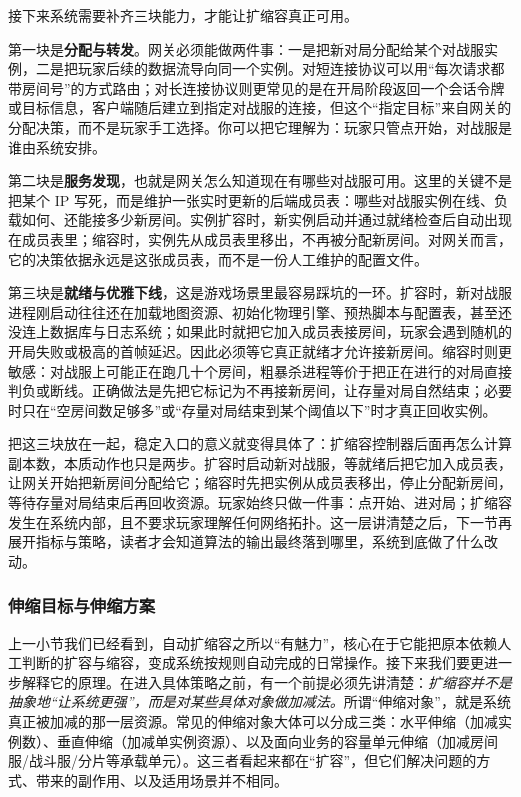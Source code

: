接下来系统需要补齐三块能力，才能让扩缩容真正可用。

第一块是\textbf{分配与转发}。网关必须能做两件事：一是把新对局分配给某个对战服实例，二是把玩家后续的数据流导向同一个实例。对短连接协议可以用“每次请求都带房间号”的方式路由；对长连接协议则更常见的是在开局阶段返回一个会话令牌或目标信息，客户端随后建立到指定对战服的连接，但这个“指定目标”来自网关的分配决策，而不是玩家手工选择。你可以把它理解为：玩家只管点开始，对战服是谁由系统安排。

第二块是\textbf{服务发现}，也就是网关怎么知道现在有哪些对战服可用。这里的关键不是把某个 IP 写死，而是维护一张实时更新的后端成员表：哪些对战服实例在线、负载如何、还能接多少新房间。实例扩容时，新实例启动并通过就绪检查后自动出现在成员表里；缩容时，实例先从成员表里移出，不再被分配新房间。对网关而言，它的决策依据永远是这张成员表，而不是一份人工维护的配置文件。

第三块是\textbf{就绪与优雅下线}，这是游戏场景里最容易踩坑的一环。扩容时，新对战服进程刚启动往往还在加载地图资源、初始化物理引擎、预热脚本与配置表，甚至还没连上数据库与日志系统；如果此时就把它加入成员表接房间，玩家会遇到随机的开局失败或极高的首帧延迟。因此必须等它真正就绪才允许接新房间。缩容时则更敏感：对战服上可能正在跑几十个房间，粗暴杀进程等价于把正在进行的对局直接判负或断线。正确做法是先把它标记为不再接新房间，让存量对局自然结束；必要时只在“空房间数足够多”或“存量对局结束到某个阈值以下”时才真正回收实例。

把这三块放在一起，稳定入口的意义就变得具体了：扩缩容控制器后面再怎么计算副本数，本质动作也只是两步。扩容时启动新对战服，等就绪后把它加入成员表，让网关开始把新房间分配给它；缩容时先把实例从成员表移出，停止分配新房间，等待存量对局结束后再回收资源。玩家始终只做一件事：点开始、进对局；扩缩容发生在系统内部，且不要求玩家理解任何网络拓扑。这一层讲清楚之后，下一节再展开指标与策略，读者才会知道算法的输出最终落到哪里，系统到底做了什么改动。

\subsubsection{伸缩目标与伸缩方案}
上一小节我们已经看到，自动扩缩容之所以“有魅力”，核心在于它能把原本依赖人工判断的扩容与缩容，变成系统按规则自动完成的日常操作。接下来我们要更进一步解释它的原理。在进入具体策略之前，有一个前提必须先讲清楚：\emph{扩缩容并不是抽象地“让系统更强”，而是对某些具体对象做加减法。}所谓“伸缩对象”，就是系统真正被加减的那一层资源。常见的伸缩对象大体可以分成三类：水平伸缩（加减实例数）、垂直伸缩（加减单实例资源）、以及面向业务的容量单元伸缩（加减房间服/战斗服/分片等承载单元）。这三者看起来都在“扩容”，但它们解决问题的方式、带来的副作用、以及适用场景并不相同。

